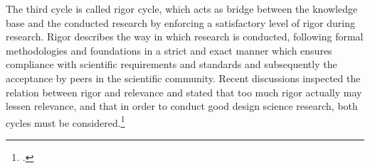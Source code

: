 The third cycle is called rigor cycle, which acts as bridge between the knowledge base and the conducted research by enforcing a satisfactory level of rigor during research. Rigor describes the way in which research is conducted, following formal methodologies and foundations in a strict and exact manner which ensures compliance with scientific requirements and standards and subsequently the acceptance by peers in the scientific community. Recent discussions inspected the relation between rigor and relevance and stated that too much rigor actually may lessen relevance, and that in order to conduct good design science research, both cycles must be considered.\footcites[Cf.][p.5]{BenbasatEmpiricalresearchinformation1999}[cf.][p.88]{HevnerDesignScienceResearch2004}[cf.][p.130]{ThomasBekannteundweniger2014}[cf.][p.91]{Hevnerthreecycleview2007}
